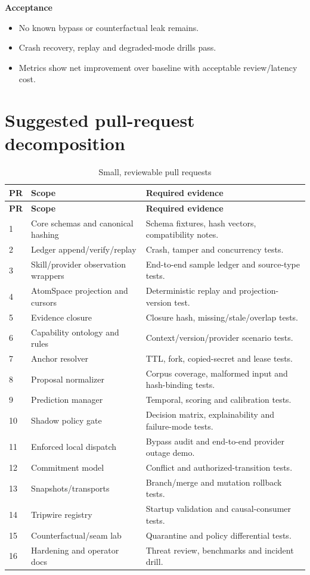 \documentclass[11pt,oneside]{report}
\begin{document}
\textbf{Acceptance}
\begin{itemize}
  \item No known bypass or counterfactual leak remains.
  \item Crash recovery, replay and degraded-mode drills pass.
  \item Metrics show net improvement over baseline with acceptable review/latency cost.
\end{itemize}

\chapter{Suggested pull-request decomposition}

\begin{longtable}{@{}C{0.50in}L{1.90in}L{4.05in}@{}}
\caption{Small, reviewable pull requests}\label{tab:prs}\\
\toprule
\textbf{PR} & \textbf{Scope} & \textbf{Required evidence} \\
\midrule
\endfirsthead
\toprule
\textbf{PR} & \textbf{Scope} & \textbf{Required evidence} \\
\midrule
{} & Core schemas and canonical hashing & Schema fixtures, hash vectors, compatibility notes. \\
2 & Ledger append/verify/replay & Crash, tamper and concurrency tests. \\
3 & Skill/provider observation wrappers & End-to-end sample ledger and source-type tests. \\
4 & AtomSpace projection and cursors & Deterministic replay and projection-version test. \\
5 & Evidence closure & Closure hash, missing/stale/overlap tests. \\
6 & Capability ontology and rules & Context/version/provider scenario tests. \\
7 & Anchor resolver & TTL, fork, copied-secret and lease tests. \\
8 & Proposal normalizer & Corpus coverage, malformed input and hash-binding tests. \\
9 & Prediction manager & Temporal, scoring and calibration tests. \\
10 & Shadow policy gate & Decision matrix, explainability and failure-mode tests. \\
11 & Enforced local dispatch & Bypass audit and end-to-end provider outage demo. \\
12 & Commitment model & Conflict and authorized-transition tests. \\
13 & Snapshots/transports & Branch/merge and mutation rollback tests. \\
14 & Tripwire registry & Startup validation and causal-consumer tests. \\
15 & Counterfactual/seam lab & Quarantine and policy differential tests. \\
16 & Hardening and operator docs & Threat review, benchmarks and incident drill. \\
\bottomrule
\end{longtable}
\end{document}
